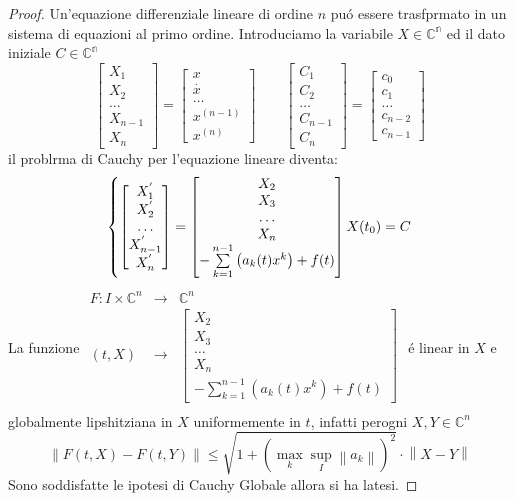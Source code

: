 \begin{proof}
	Un'equazione differenziale lineare di ordine $n$ pu\'o essere trasfprmato in un sistema di equazioni al primo ordine.
	Introduciamo la variabile $X\in\mathbb{C^n}$ ed il dato iniziale $C\in\mathbb{C^n}$
	$$\left[\begin{matrix} X_1\\X_2\\\ldots\\X_{n-1}\\X_n \end{matrix}\right] = \left[\begin{matrix} x\\\overset{\cdot}{x}\\\ldots\\ x^{(n-1)}\\x^{(n)} \end{matrix}\right]\quad\quad\left[\begin{matrix} C_1\\C_2\\\ldots\\C_{n-1}\\C_{n} \end{matrix}\right] = \left[\begin{matrix} c_0\\c_1\\\ldots\\ c_{n-2}\\c_{n-1} \end{matrix}\right]$$
	il problrma di Cauchy per l'equazione lineare diventa:
	$$
	\left\{
	\left[\begin{matrix} X_1^{'}\\X_2^{'}\\\ldots\\X_{n-1}^{'}\\X_n^{'} \end{matrix}\right]
	=
	\left[\begin{matrix} X_2\\X_3\\\ldots\\X_{n}\\-\sum\limits_{k=1}^{n-1}\left(a_k(t)x^k\right)+f(t) \end{matrix}\right]
	\\
	X(t_0)=C
	\right.
	$$
	La funzione
	$\begin{array}{rcl} 
	F: I\times\mathbb{C}^n & \to & \mathbb{C}^n \\
	   (t,X) & \to & \left[\begin{matrix} X_2\\X_3\\\ldots\\X_{n}\\-\sum\limits_{k=1}^{n-1}\left(a_k(t)x^k\right)+f(t) \end{matrix}\right] \\ 
	\end{array}$
	\'e linear in $X$ e globalmente lipshitziana in $X$ uniformemente in $t$, infatti perogni $X,Y\in\mathbb{C}^n$
	$$\left\|F(t,X)-F(t,Y)\right\|\le \sqrt{1+\left( \max\limits_k \sup\limits_I \left\|a_k\right\| \right)^2}\cdot\left\|X-Y\right\|$$
	Sono soddisfatte le ipotesi di Cauchy Globale allora si ha latesi.
\end{proof}
